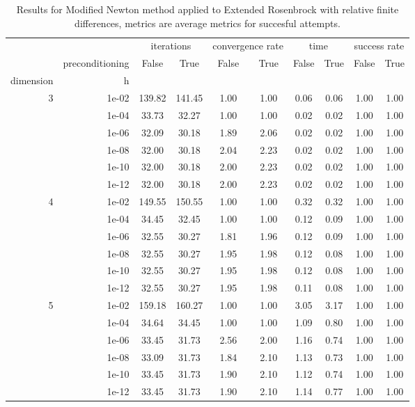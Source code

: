 \begin{table}
\centering
\caption{Results for Modified Newton method applied to Extended Rosenbrock with relative finite differences, metrics are average metrics for succesful attempts.}
\label{tab:Modified_Newton_Extended_Rosenbrock_fd_rel}
\begin{tabular}{rr|cc|cc|cc|cc}
\toprule
    &  & \multicolumn{2}{|c}{iterations} & \multicolumn{2}{|c}{convergence rate} & \multicolumn{2}{|c}{time} & \multicolumn{2}{|c}{success rate} \\
    & preconditioning & False & True & False & True & False & True & False & True \\
dimension & h &  &  &  &  &  &  &  &  \\
\midrule
\multirow[t]{6}{*}{3} & 1e-02 & 139.82 & 141.45 & 1.00 & 1.00 & 0.06 & 0.06 & 1.00 & 1.00 \\
    & 1e-04 & 33.73 & 32.27 & 1.00 & 1.00 & 0.02 & 0.02 & 1.00 & 1.00 \\
    & 1e-06 & 32.09 & 30.18 & 1.89 & 2.06 & 0.02 & 0.02 & 1.00 & 1.00 \\
    & 1e-08 & 32.00 & 30.18 & 2.04 & 2.23 & 0.02 & 0.02 & 1.00 & 1.00 \\
    & 1e-10 & 32.00 & 30.18 & 2.00 & 2.23 & 0.02 & 0.02 & 1.00 & 1.00 \\
    & 1e-12 & 32.00 & 30.18 & 2.00 & 2.23 & 0.02 & 0.02 & 1.00 & 1.00 \\
\cline{1-10}
\multirow[t]{6}{*}{4} & 1e-02 & 149.55 & 150.55 & 1.00 & 1.00 & 0.32 & 0.32 & 1.00 & 1.00 \\
    & 1e-04 & 34.45 & 32.45 & 1.00 & 1.00 & 0.12 & 0.09 & 1.00 & 1.00 \\
    & 1e-06 & 32.55 & 30.27 & 1.81 & 1.96 & 0.12 & 0.09 & 1.00 & 1.00 \\
    & 1e-08 & 32.55 & 30.27 & 1.95 & 1.98 & 0.12 & 0.08 & 1.00 & 1.00 \\
    & 1e-10 & 32.55 & 30.27 & 1.95 & 1.98 & 0.12 & 0.08 & 1.00 & 1.00 \\
    & 1e-12 & 32.55 & 30.27 & 1.95 & 1.98 & 0.11 & 0.08 & 1.00 & 1.00 \\
\cline{1-10}
\multirow[t]{6}{*}{5} & 1e-02 & 159.18 & 160.27 & 1.00 & 1.00 & 3.05 & 3.17 & 1.00 & 1.00 \\
    & 1e-04 & 34.64 & 34.45 & 1.00 & 1.00 & 1.09 & 0.80 & 1.00 & 1.00 \\
    & 1e-06 & 33.45 & 31.73 & 2.56 & 2.00 & 1.16 & 0.74 & 1.00 & 1.00 \\
    & 1e-08 & 33.09 & 31.73 & 1.84 & 2.10 & 1.13 & 0.73 & 1.00 & 1.00 \\
    & 1e-10 & 33.45 & 31.73 & 1.90 & 2.10 & 1.12 & 0.74 & 1.00 & 1.00 \\
    & 1e-12 & 33.45 & 31.73 & 1.90 & 2.10 & 1.14 & 0.77 & 1.00 & 1.00 \\
\cline{1-10}
\bottomrule
\end{tabular}
\end{table}

